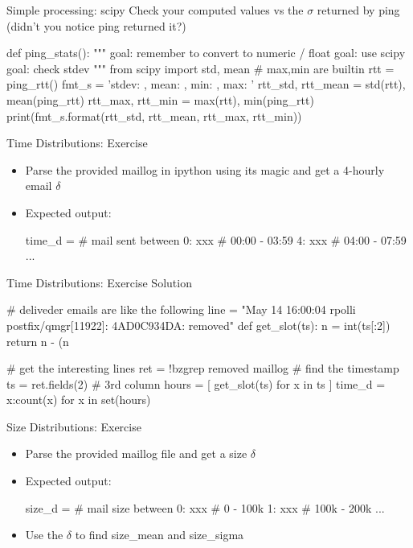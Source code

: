 \begin{frame}[fragile]{Simple processing: scipy}
Check your computed values vs the $\sigma$ returned by ping 
(didn't you notice ping returned it?) 
\begin{pythoncode}
def ping_stats():
    """
       goal: remember to convert to numeric / float
       goal: use scipy
       goal: check stdev
    """
    from scipy import std, mean # max,min are builtin
    rtt = ping_rtt()
    fmt_s = 'stdev: {}, mean: {}, min: {}, max: {}'
    rtt_std, rtt_mean = std(rtt), mean(ping_rtt)
    rtt_max, rtt_min = max(rtt), min(ping_rtt)
    print(fmt_s.format(rtt_std, rtt_mean, rtt_max, rtt_min))
\end{pythoncode}
\end{frame}

\begin{frame}[fragile]{Time Distributions: Exercise}
\begin{itemize}
\item Parse the provided maillog in ipython using its magic and get a 4-hourly email $\delta$
\item Expected output: 
\begin{pythoncode}
time_d = {  # mail sent between
    0: xxx  #  00:00 - 03:59
    4: xxx  #  04:00 - 07:59
    ...
    }
\end{pythoncode}
\end{itemize}
\end{frame}
 
\iftrue
\begin{frame}[fragile]{Time Distributions: Exercise Solution}
\begin{pythoncode}
# deliveder emails are like the following
line = "May 14 16:00:04 rpolli postfix/qmgr[11922]: 4AD0C934DA: removed"
def get_slot(ts):
    n = int(ts[:2])
    return n - (n%
    
# get the interesting lines
ret = !bzgrep removed maillog
# find the timestamp
ts = ret.fields(2) # 3rd column
hours = [ get_slot(ts)  for x in ts ]
time_d = {x:count(x) for x in set(hours)}
\end{pythoncode}
\end{frame}

\fi 

\begin{frame}[fragile]{Size Distributions: Exercise}
\begin{itemize}
\item Parse the provided maillog file and get a size $\delta$
\item Expected output: 
\begin{pythoncode}
size_d = {  # mail size between
    0: xxx  #  0 - 100k
    1: xxx  #  100k - 200k
    ...
    }
\end{pythoncode}
\item Use the $\delta$ to find size\_mean and size\_sigma
\end{itemize}
\end{frame}



